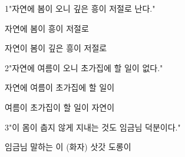 \documentclass[fs85,seriesRus]{korfarm-base}
\begin{document}
\kfActivityBg \par{}
\par{}\par\nopagebreak[4]\smallskip\nopagebreak[4]
\kfBeginMC
\begin{kfSentenceUnit}{1}{"자연에 봄이 오니 깊은 흥이 저절로 난다."}
\begin{kfChoices}
\kfChoice 자연에
\kfChoice 봄이
\kfChoice 흥이
\kfChoice 저절로
\end{kfChoices}
\begin{kfChoices}
\kfChoice 자연이
\kfChoice 봄이
\kfChoice 깊은 흥이
\kfChoice 저절로
\end{kfChoices}
\end{kfSentenceUnit}

\begin{kfSentenceUnit}{2}{"자연에 여름이 오니 초가집에 할 일이 없다."}
\begin{kfChoices}
\kfChoice 자연에
\kfChoice 여름이
\kfChoice 초가집에
\kfChoice 할 일이
\end{kfChoices}
\begin{kfChoices}
\kfChoice 여름이
\kfChoice 초가집이
\kfChoice 할 일이
\kfChoice 자연이
\end{kfChoices}
\end{kfSentenceUnit}

\begin{kfSentenceUnit}{3}{"이 몸이 춥지 않게 지내는 것도 임금님 덕분이다."}
\begin{kfChoices}
\kfChoice 임금님
\kfChoice 말하는 이 (화자)
\kfChoice 삿갓
\kfChoice 도롱이
\end{kfChoices}
\end{kfSentenceUnit}

\kfEndMC
\end{document}
